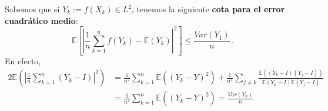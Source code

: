 \documentclass[letterpaper,11pt]{article} %
\theoremstyle{defbreak}
\theoremstyle{propbreak}
\theoremstyle{remark}
\theoremstyle{break}
\def\E{\mathbb{E}}
\def\var{Var}
\def\mean{\displaystyle\frac{1}{n}\sum^n_{k=1}}
\begin{document}
Sabemos que si $Y_k:=f(X_k)\in L^2$, tenemos la siguiente \textbf{cota para el error cuadrático medio}:
$$ \E[|\displaystyle\frac{1}{n}\sum^n_{k=1}f(Y_k)-\E(Y_k)|^2]\leq\frac{\var(Y_1)}{n} \, .$$
En efecto,
\begin{alignat*}{2}
   \E(|\mean{(Y_k-I)}|^2) &  =  \displaystyle\frac{1}{n^2}\sum_{k=1}^n\E((Y_k-Y)^2)+\frac{1}{n^2}\sum_{j\neq k}\frac{\E((Y_k-I)(Y_j-I))}{\E(Y_k-I)\E(Y_j-I)} \\
     & = \displaystyle\frac{1}{n^2}\sum_{k=1}^n\E((Y_k-Y)^2)=\frac{\var(Y_n)}{n}
\end{alignat*}
\end{document}
